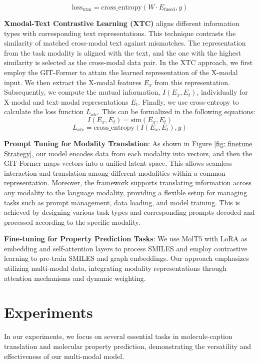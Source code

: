 \documentclass{article}
\begin{document}
\begin{equation}
\text{loss}_{\text{xtm}} = \text{cross\_entropy}(W \cdot E_{\text{fused}}, y)
\end{equation}

\textbf{Xmodal-Text Contrastive Learning (XTC)} aligns different information types with corresponding text representations. This technique contrasts the similarity of matched cross-modal text against mismatches. The representation from the task modality is aligned with the text, and the one with the highest similarity is selected as the cross-modal data pair. In the XTC approach, we first employ the GIT-Former to attain the learned representation of the X-modal input. We then extract the X-modal features $E_x$ from this representation. Subsequently, we compute the mutual information, $I(E_x, E_t)$, individually for X-modal and text-modal representations $E_t$. Finally, we use cross-entropy to calculate the loss function $L_{xtc}$. This can be formalized in the following equations:
\begin{equation}
I(E_x, E_t) = \text{sim}(E_x, E_t)
\end{equation}
\begin{equation}
L_{xtc} = \text{cross\_entropy}(I(E_x, E_t), y)
\end{equation}

\textbf{Prompt Tuning for Modality Translation}: As shown in Figure \ref{fig: finetune Strategy}, our model encodes data from each modality into vectors, and then the GIT-Former maps vectors into a unified latent space. This allows seamless interaction and translation among different modalities within a common representation. Moreover, the framework supports translating information across any modality to the language modality, providing a flexible setup for managing tasks such as prompt management, data loading, and model training. This is achieved by designing various task types and corresponding prompts decoded and processed according to the specific modality.

\textbf{Fine-tuning for Property Prediction Tasks}: We use MolT5 with LoRA as embedding and self-attention layers to process SMILES and employ contrastive learning to pre-train SMILES and graph embeddings. Our approach emphasizes utilizing multi-modal data, integrating modality representations through attention mechanisms and dynamic weighting.


\section{Experiments}
\label{sec:eva}
In our experiments, we focus on several essential tasks in molecule-caption translation and molecular property prediction, demonstrating the versatility and effectiveness of our multi-modal model.
\end{document}
